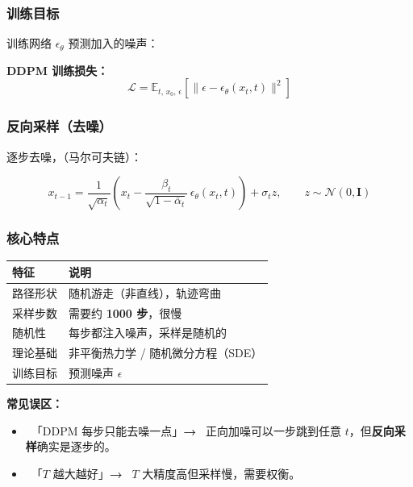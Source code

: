 \subsubsection*{训练目标}

训练网络 $\epsilon_\theta$ 预测加入的噪声：

\begin{conceptbox}
\textbf{DDPM 训练损失：}
$$\mathcal{L} = \mathbb{E}_{t,\, x_0,\, \epsilon}\!\left[
  \|\epsilon - \epsilon_\theta(x_t, t)\|^2\right]$$
\end{conceptbox}

\subsubsection*{反向采样（去噪）}

逐步去噪，（马尔可夫链）：

$$x_{t-1} = \frac{1}{\sqrt{\alpha_t}}\!\left(
  x_t - \frac{\beta_t}{\sqrt{1-\bar{\alpha}_t}}\,\epsilon_\theta(x_t, t)
\right) + \sigma_t z, \qquad z \sim \mathcal{N}(0,\mathbf{I})$$

\subsubsection*{核心特点}

\begin{table}[h]
\centering
\renewcommand{\arraystretch}{1.25}
\begin{tabular}{ll}
\hline
\textbf{特征} & \textbf{说明} \\
\hline
路径形状 & 随机游走（非直线），轨迹弯曲 \\
采样步数 & 需要约 \textbf{1000 步}，很慢 \\
随机性   & 每步都注入噪声，采样是随机的 \\
理论基础 & 非平衡热力学 / 随机微分方程（SDE） \\
训练目标 & 预测噪声 $\epsilon$ \\
\hline
\end{tabular}
\end{table}

\begin{warnbox}
\textbf{常见误区：}
\begin{itemize}
  \item {}~「DDPM 每步只能去噪一点」\;\textbf{→}\;
        ~正向加噪可以一步跳到任意 $t$，但\textbf{反向采样}确实是逐步的。
  \item {}~「$T$ 越大越好」\;\textbf{→}\;
        ~$T$ 大精度高但采样慢，需要权衡。
\end{itemize}
\end{warnbox}

